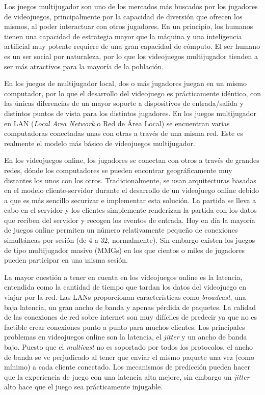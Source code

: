 Los juegos multijugador \cite{7} son uno de los mercados más buscados por los jugadores de videojuegos, principalmente por la capacidad de diversión que ofrecen los mismos, al poder interactuar con otros jugadores. En un principio, los humanos tienen una capacidad de estrategia mayor que la máquina y una inteligencia artificial muy potente requiere de una gran capacidad de cómputo. El ser humano es un ser social por naturaleza, por lo que los videojuegos multijugador tienden a ser más atractivos para la mayoría de la población.

En los juegos de multijugador local, dos o más jugadores juegan en un mismo computador, por lo que el desarrollo del videojuego es prácticamente idéntico, con las únicas diferencias de un mayor soporte a dispositivos de entrada/salida y distintos puntos de vista para los distintos jugadores. En los juegos multijugador en LAN (\textit{Local Area Network} o Red de Área Local) se encuentran varias computadoras conectadas unas con otras a través de una misma red. Este es realmente el modelo más básico de videojuegos multijugador.

En los videojuegos online, los jugadores se conectan con otros a través de grandes redes, dónde los computadores se pueden encontrar geográficamente muy distantes los unos con los otros. Tradicionalmente, se usan arquitecturas basadas en el modelo cliente-servidor \cite{8} durante el desarrollo de un videojuego online debido a que es más sencillo securizar e implementar esta solución. La partida se lleva a cabo en el servidor y los clientes simplemente renderizan la partida con los datos que reciben del servidor y recogen los eventos de entrada. Hoy en día la mayoría de juegos online permiten un número relativamente pequeño de conexiones simultáneas por sesión (de 4 a 32, normalmente). Sin embargo existen los juegos de tipo multijugador masivo (MMGs) en los que cientos o miles de jugadores pueden participar en una misma sesión.

La mayor cuestión a tener en cuenta en los videojuegos online es la latencia, entendida como la cantidad de tiempo que tardan los datos del videojuego en viajar por la red. Las LANs proporcionan características como \textit{broadcast}, una baja latencia, un gran ancho de banda y apenas pérdida de paquetes. La calidad de las conexiones de red sobre internet son muy difíciles de predecir ya que no es factible crear conexiones punto a punto para muchos clientes. Los principales problemas en videojuegos online \cite{9} son la latencia, el \textit{jitter} y un ancho de banda bajo. Puesto que el \textit{multicast} no es soportado por todos los protocolos, el ancho de banda se ve perjudicado al tener que enviar el mismo paquete una vez (como mínimo) a cada cliente conectado. Los mecanismos de predicción pueden hacer que la experiencia de juego con una latencia alta mejore, sin embargo un \textit{jitter} alto hace que el juego sea prácticamente injugable.

